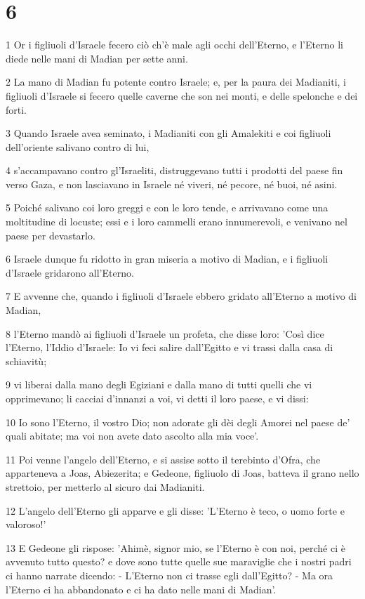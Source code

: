 \chapter{6}

\par 1 Or i figliuoli d'Israele fecero ciò ch'è male agli occhi dell'Eterno, e l'Eterno li diede nelle mani di Madian per sette anni.
\par 2 La mano di Madian fu potente contro Israele; e, per la paura dei Madianiti, i figliuoli d'Israele si fecero quelle caverne che son nei monti, e delle spelonche e dei forti.
\par 3 Quando Israele avea seminato, i Madianiti con gli Amalekiti e coi figliuoli dell'oriente salivano contro di lui,
\par 4 s'accampavano contro gl'Israeliti, distruggevano tutti i prodotti del paese fin verso Gaza, e non lasciavano in Israele né viveri, né pecore, né buoi, né asini.
\par 5 Poiché salivano coi loro greggi e con le loro tende, e arrivavano come una moltitudine di locuste; essi e i loro cammelli erano innumerevoli, e venivano nel paese per devastarlo.
\par 6 Israele dunque fu ridotto in gran miseria a motivo di Madian, e i figliuoli d'Israele gridarono all'Eterno.
\par 7 E avvenne che, quando i figliuoli d'Israele ebbero gridato all'Eterno a motivo di Madian,
\par 8 l'Eterno mandò ai figliuoli d'Israele un profeta, che disse loro: 'Così dice l'Eterno, l'Iddio d'Israele: Io vi feci salire dall'Egitto e vi trassi dalla casa di schiavitù;
\par 9 vi liberai dalla mano degli Egiziani e dalla mano di tutti quelli che vi opprimevano; li cacciai d'innanzi a voi, vi detti il loro paese, e vi dissi:
\par 10 Io sono l'Eterno, il vostro Dio; non adorate gli dèi degli Amorei nel paese de' quali abitate; ma voi non avete dato ascolto alla mia voce'.
\par 11 Poi venne l'angelo dell'Eterno, e si assise sotto il terebinto d'Ofra, che apparteneva a Joas, Abiezerita; e Gedeone, figliuolo di Joas, batteva il grano nello strettoio, per metterlo al sicuro dai Madianiti.
\par 12 L'angelo dell'Eterno gli apparve e gli disse: 'L'Eterno è teco, o uomo forte e valoroso!'
\par 13 E Gedeone gli rispose: 'Ahimè, signor mio, se l'Eterno è con noi, perché ci è avvenuto tutto questo? e dove sono tutte quelle sue maraviglie che i nostri padri ci hanno narrate dicendo: - L'Eterno non ci trasse egli dall'Egitto? - Ma ora l'Eterno ci ha abbandonato e ci ha dato nelle mani di Madian'.
